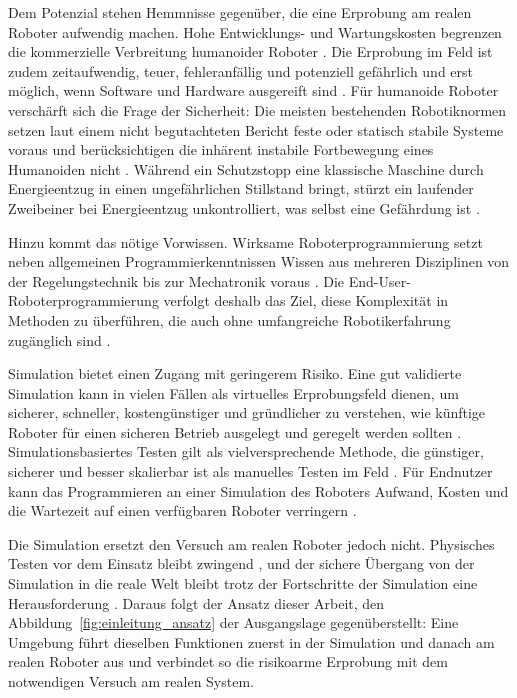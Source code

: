 Dem Potenzial stehen Hemmnisse gegenüber, die eine Erprobung am realen Roboter aufwendig machen.
Hohe Entwicklungs- und Wartungskosten begrenzen die kommerzielle Verbreitung humanoider Roboter \cite{Tong2024}.
Die Erprobung im Feld ist zudem zeitaufwendig, teuer, fehleranfällig und potenziell gefährlich und erst möglich, wenn Software und Hardware ausgereift sind \cite{Afzal2021}.
Für humanoide Roboter verschärft sich die Frage der Sicherheit: Die meisten bestehenden Robotiknormen setzen laut einem nicht begutachteten Bericht feste oder statisch stabile Systeme voraus und berücksichtigen die inhärent instabile Fortbewegung eines Humanoiden nicht \cite{Prather2025}.
Während ein Schutzstopp eine klassische Maschine durch Energieentzug in einen ungefährlichen Stillstand bringt, stürzt ein laufender Zweibeiner bei Energieentzug unkontrolliert, was selbst eine Gefährdung ist \cite{Ding2026}.

Hinzu kommt das nötige Vorwissen.
Wirksame Roboterprogrammierung setzt neben allgemeinen Programmierkenntnissen Wissen aus mehreren Disziplinen von der Regelungstechnik bis zur Mechatronik voraus \cite{Ajaykumar2021}.
Die End-User-Roboterprogrammierung verfolgt deshalb das Ziel, diese Komplexität in Methoden zu überführen, die auch ohne umfangreiche Robotikerfahrung zugänglich sind \cite{Ajaykumar2021}.

Simulation bietet einen Zugang mit geringerem Risiko.
Eine gut validierte Simulation kann in vielen Fällen als virtuelles Erprobungsfeld dienen, um sicherer, schneller, kostengünstiger und gründlicher zu verstehen, wie künftige Roboter für einen sicheren Betrieb ausgelegt und geregelt werden sollten \cite{Choi2021}.
Simulationsbasiertes Testen gilt als vielversprechende Methode, die günstiger, sicherer und besser skalierbar ist als manuelles Testen im Feld \cite{Afzal2021}.
Für Endnutzer kann das Programmieren an einer Simulation des Roboters Aufwand, Kosten und die Wartezeit auf einen verfügbaren Roboter verringern \cite{Ajaykumar2021}.

Die Simulation ersetzt den Versuch am realen Roboter jedoch nicht.
Physisches Testen vor dem Einsatz bleibt zwingend \cite{Choi2021}, und der sichere Übergang von der Simulation in die reale Welt bleibt trotz der Fortschritte der Simulation eine Herausforderung \cite{Tong2024}.
Daraus folgt der Ansatz dieser Arbeit, den Abbildung~\ref{fig:einleitung_ansatz} der Ausgangslage gegenüberstellt: Eine Umgebung führt dieselben Funktionen zuerst in der Simulation und danach am realen Roboter aus und verbindet so die risikoarme Erprobung mit dem notwendigen Versuch am realen System.

